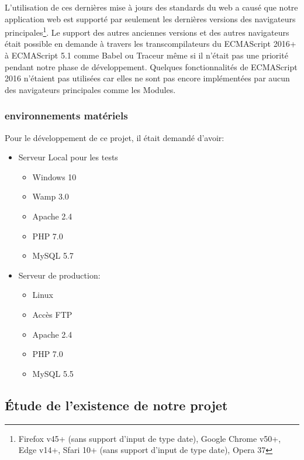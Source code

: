 L'utilisation de ces dernières mise à jours des standards du web a causé que
notre application web est supporté par seulement les dernières versions des
navigateurs principales\footnote{Firefox v45+ (sans support d'input de type
date), Google Chrome v50+, Edge v14+, Sfari 10+ (sans support d'input de type
date), Opera 37}. Le support des autres anciennes versions et des autres
navigateurs était possible en demande à travers les transcompilateurs du
ECMAScript 2016+ à ECMAScript 5.1 comme Babel ou Traceur même si il n'était pas
une priorité pendant notre phase de développement. Quelques fonctionnalités de
ECMAScript 2016 n'étaient pas utilisées car elles ne sont pas encore
implémentées par aucun des navigateurs principales comme les Modules.

\subsubsection{environnements matériels}

Pour le développement de ce projet, il était demandé d'avoir:

\begin{itemize}
    \item Serveur Local pour les tests
        \begin{itemize}
            \item Windows 10
            \item Wamp 3.0
            \item Apache 2.4
            \item PHP 7.0
            \item MySQL 5.7
        \end{itemize}
    \item Serveur de production:
        \begin{itemize}
            \item Linux
            \item Accès FTP
            \item Apache 2.4
            \item PHP 7.0
            \item MySQL 5.5
        \end{itemize}
\end{itemize}

\subsection{Étude de l'existence de notre projet}

